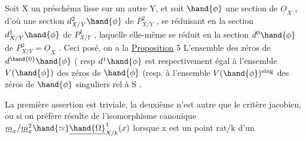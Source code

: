  Soit X un préschéma lisse sur un
autre Y, et soit $\hand{\phi}$ une section de $\underline{O}_X$ , d'où une section $d^2_{X/Y}\hand{\phi}$ de
$P^2_{X/Y}$ , se réduisant en la section $d^1_{X/Y}\hand{\phi}$ de $P^1_{X/Y}$ , laquelle elle-même
se réduit en la section $d^0\hand{\phi}$  de $P^0_{X/Y} = \underline{O}_X$ . Ceci posé, on a la
\uline{Proposition} 5 L'ensemble des zéros de $d^{\hand{0}}\hand{\phi}$ ( resp $d^1\hand{\phi}$ \hand{)} 
 est respectivement égal à l'ensemble $V(\hand{\phi})$ des zéros de $\hand{\phi}$ (resp. à
l'ensemble $V(\hand{\phi})^{\mathrm{sing}}$ des zéros de $\hand{\phi}$ singuliers rel à S\hand{)} 
.

La première assertion est triviale, la deuxième n'est autre
que le critère jacobien, ou si on préfère résulte de l'isomorphisme
canonique $\underline{m}_x/\underline{m}_x^2 \hand{\simeq} \underline{\hand{\Omega}}^1_{X/k}(x)$ lorsque x est un point rat/k d'un

